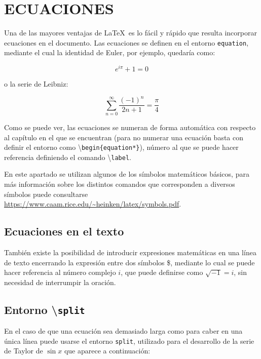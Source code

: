 \documentclass[a4paper, 11pt, spanish, twoside]{article}
\begin{document}

\newpage
\section{ECUACIONES} \label{sec:ecuaciones}

Una de las mayores ventajas de \LaTeX \ es lo fácil y rápido que resulta incorporar ecuaciones en el documento. Las ecuaciones se definen en el entorno \texttt{equation}, mediante el cual la identidad de Euler, por ejemplo, quedaría como:

\begin{equation}
    e^{i\pi} + 1 = 0
    \label{eq:euler}
\end{equation}

o la serie de Leibniz:

\begin{equation}
    \sum_{n=0}^\infty \frac{(-1)^n}{2n+1} = \frac{\pi}{4}
    \label{eq:leibniz}
\end{equation}

Como se puede ver, las ecuaciones se numeran de forma automática con respecto al capítulo en el que se encuentran (para no numerar una ecuación basta con definir el entorno como \textbackslash\texttt{begin\{equation*\}}), número al que se puede hacer referencia definiendo el comando \textbackslash\texttt{label}.

En este apartado se utilizan algunos de los símbolos matemáticos básicos, para más información sobre los distintos comandos que corresponden a diversos símbolos puede consultarse \url{https://www.caam.rice.edu/~heinken/latex/symbols.pdf}.


\subsection{Ecuaciones en el texto}

También existe la posibilidad de introducir expresiones matemáticas en una línea de texto encerrando la expresión entre dos símbolos \$, mediante lo cual se puede hacer referencia al número complejo $i$, que puede definirse como $\sqrt{-1}=i$, sin necesidad de interrumpir la oración.


\subsection{Entorno \textbackslash\texttt{split}}

En el caso de que una ecuación sea demasiado larga como para caber en una única línea puede usarse el entorno \texttt{split}, utilizado para el desarrollo de la serie de Taylor de $\sin{x}$ que aparece a continuación:
\end{document}
